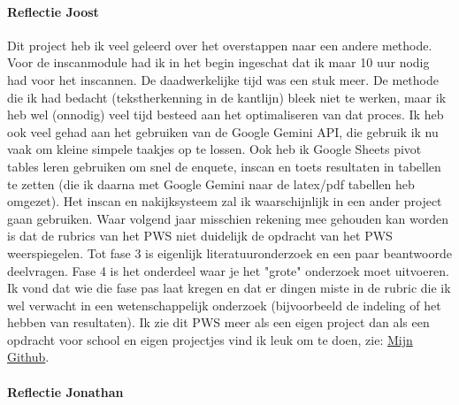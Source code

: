 \documentclass[12pt]{article}
\begin{document}
\begin{multicols}{2}
\paragraph*{Reflectie Joost} Dit project heb ik veel geleerd over het overstappen naar een andere methode. Voor de inscanmodule had ik in het begin ingeschat dat ik maar 10 uur nodig had voor het inscannen. De daadwerkelijke tijd was een stuk meer. De methode die ik had bedacht (tekstherkenning in de kantlijn) bleek niet te werken, maar ik heb wel (onnodig) veel tijd besteed aan het optimaliseren van dat proces. Ik heb ook veel gehad aan het gebruiken van de Google Gemini API, die gebruik ik nu vaak om kleine simpele taakjes op te lossen. Ook heb ik Google Sheets pivot tables leren gebruiken om snel de enquete, inscan en toets resultaten in tabellen te zetten (die ik daarna met Google Gemini naar de latex/pdf tabellen heb omgezet). Het inscan en nakijksysteem zal ik waarschijnlijk in een ander project gaan gebruiken. Waar volgend jaar misschien rekening mee gehouden kan worden is dat de rubrics van het PWS niet duidelijk de opdracht van het PWS weerspiegelen. Tot fase 3 is eigenlijk literatuuronderzoek en een paar beantwoorde deelvragen. Fase 4 is het onderdeel waar je het "grote" onderzoek moet uitvoeren. Ik vond dat wie die fase pas laat kregen en dat er dingen miste in de rubric die ik wel verwacht in een wetenschappelijk onderzoek (bijvoorbeeld de indeling of het hebben van resultaten). Ik zie dit PWS meer als een eigen project dan als een opdracht voor school en eigen projectjes vind ik leuk om te doen, zie: \href{https://github.com/TanteJossa}{Mijn Github}.  
\paragraph*{Reflectie Jonathan}

\end{multicols}
\end{document}
